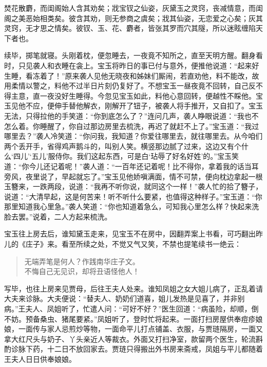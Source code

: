\documentclass[12pt,oneside]{book}
\newenvironment{shici}{%
\begin{verse}%
\centering\large\hspace{12pt}}%
{\end{verse}}
\begin{document}
焚花散麝，而闺阁始人含其劝矣；戕宝钗之仙姿，灰黛玉之灵窍，丧减情意，而闺阁之美恶始相类矣。彼含其劝，则无参商之虞矣；戕其仙姿，无恋爱之心矣；灰其灵窍，无才思之情矣。彼钗、玉、花、麝者，皆张其罗而穴其隧，所以迷眩缠陷天下者也。

续毕，掷笔就寝。头刚着枕，便忽睡去，一夜竟不知所之，直至天明方醒。翻身看时，只见袭人和衣睡在衾上。宝玉将昨日的事已付与意外，便推他说道：“起来好生睡，看冻着了！”原来袭人见他无晓夜和姊妹们厮闹，若直劝他，料不能改，故用柔情以警之，料他不过半日片刻仍复好了。不想宝玉一昼夜竟不回转，自己反不得主意，直一夜没好生睡得。今忽见宝玉如此，料他心意回转，便越性不睬他。宝玉见他不应，便伸手替他解衣，刚解开了钮子，被袭人将手推开，又自扣了。宝玉无法，只得拉他的手笑道：“你到底怎么了？”连问几声，袭人睁眼说道：“我也不怎么着。你睡醒了，你自过那边房里去梳洗，再迟了就赶不上了。”宝玉道：“我过哪里去？”袭人冷笑道：“你问我，我知道？你爱往哪里去，就往哪里去。从今咱们两个丢开手，省得鸡声鹅斗的，叫别人笑。横竖那边腻了过来，这边又有个什么‘四儿’‘五儿’服侍你。我们这起东西，可是白‘玷辱了好名好姓’的。”宝玉笑道：“你今儿还记着呢！”袭人道：“一百年还记着呢！比不得你，拿着我的话当耳旁风，夜里说了，早起就忘了。”宝玉见他娇嗔满面，情不可禁，便向枕边拿起一根玉簪来，一跌两段，说道：“我再不听你说，就同这个一样！”袭人忙的拾了簪子，说道：“大清早起，这是何苦来！听不听什么要紧，也值得这种样子。”宝玉道：“你那里知道我心里急。”袭人笑道：“你也知道着急么，可知我心里怎么样？快起来洗脸去罢。”说着，二人方起来梳洗。

宝玉往上房去后，谁知黛玉走来，见宝玉不在房中，因翻弄案上书看，可巧翻出昨儿的《庄子》来。看至所续之处，不觉又气又笑，不禁也提笔续书一绝云：

\begin{shici}
无端弄笔是何人？作践南华庄子文。\\
不悔自己无见识，却将丑语怪他人！
\end{shici}


写毕，也往上房来见贾母，后往王夫人处来。谁知凤姐之女大姐儿病了，正乱着请大夫来诊脉。大夫便说：“替夫人、奶奶们道喜，姐儿发热是见喜了，并非别病。”王夫人、凤姐听了，忙遣人问：“可好不好？”医生回道：“病虽险，却顺，倒不妨。预备桑虫、猪尾要紧。”凤姐听了，登时忙将起来。一面打扫房屋供奉痘疹娘娘，一面传与家人忌煎炒等物，一面命平儿打点铺盖、衣服，与贾琏隔房，一面又拿大红尺头与奶子、丫头亲近人等裁衣。外面又打扫净室，款留两个医生，轮流斟酌诊脉下药，十二日不放回家去。贾琏只得搬出外书房来斋戒，凤姐与平儿都随着王夫人日日供奉娘娘。
\end{document}
